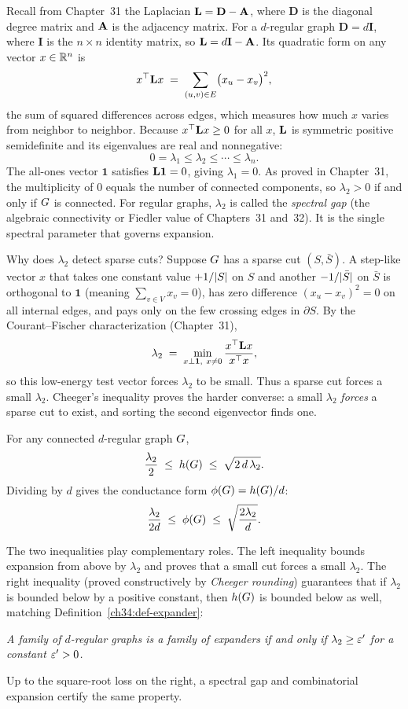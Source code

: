 Recall from Chapter~31 the Laplacian $\mathbf{L}=\mathbf{D}-\mathbf{A}$, where $\mathbf{D}$ is the diagonal degree matrix and $\mathbf{A}$ is the adjacency matrix. For a $d$-regular graph $\mathbf{D}=d\mathbf{I}$, where $\mathbf{I}$ is the $n\times n$ identity matrix, so $\mathbf{L}=d\mathbf{I}-\mathbf{A}$. Its quadratic form on any vector $x\in\mathbb{R}^n$ is
\[
  x^\top \mathbf{L} x \;=\; \sum_{(u,v)\in E}\bigl(x_u-x_v\bigr)^2,
\]
the sum of squared differences across edges, which measures how much $x$ varies from neighbor to neighbor. Because $x^\top\mathbf{L} x\ge 0$ for all $x$, $\mathbf{L}$ is symmetric positive semidefinite and its eigenvalues are real and nonnegative:
\[
  0=\lambda_1\le \lambda_2\le\cdots\le\lambda_n.
\]
The all-ones vector $\mathbf{1}$ satisfies $\mathbf{L}\mathbf{1}=0$, giving $\lambda_1=0$. As proved in Chapter~31, the multiplicity of $0$ equals the number of connected components, so $\lambda_2>0$ if and only if $G$ is connected. For regular graphs, $\lambda_2$ is called the \emph{spectral gap} (the algebraic connectivity or Fiedler value of Chapters~31 and~32). It is the single spectral parameter that governs expansion.

\begin{intuitionbox}
Why does $\lambda_2$ detect sparse cuts? Suppose $G$ has a sparse cut $(S,\bar S)$. A step-like vector $x$ that takes one constant value $+1/\lvert S\rvert$ on $S$ and another $-1/\lvert\bar S\rvert$ on $\bar S$ is orthogonal to $\mathbf{1}$ (meaning $\sum_{v\in V}x_v = 0$), has zero difference $(x_u-x_v)^2=0$ on all internal edges, and pays only on the few crossing edges in $\partial S$. By the Courant--Fischer characterization (Chapter~31),
\[
  \lambda_2\;=\;\min_{x\perp\mathbf{1},\ x\ne 0}\frac{x^\top\mathbf{L} x}{x^\top x},
\]
so this low-energy test vector forces $\lambda_2$ to be small. Thus a sparse cut forces a small $\lambda_2$. Cheeger's inequality proves the harder converse: a small $\lambda_2$ \emph{forces} a sparse cut to exist, and sorting the second eigenvector finds one.
\end{intuitionbox}

\begin{theorem}
\label{ch34:thm-cheeger}
For any connected $d$-regular graph $G$,
\[
  \frac{\lambda_2}{2}\;\le\; h(G)\;\le\;\sqrt{2\,d\,\lambda_2}.
\]
Dividing by $d$ gives the conductance form $\phi(G)=h(G)/d$:
\[
  \frac{\lambda_2}{2d}\;\le\; \phi(G)\;\le\;\sqrt{\frac{2\lambda_2}{d}}.
\]
\end{theorem}

The two inequalities play complementary roles. The left inequality bounds expansion from above by $\lambda_2$ and proves that a small cut forces a small $\lambda_2$. The right inequality (proved constructively by \emph{Cheeger rounding}) guarantees that if $\lambda_2$ is bounded below by a positive constant, then $h(G)$ is bounded below as well, matching Definition~\ref{ch34:def-expander}:
\begin{center}
\emph{A family of $d$-regular graphs is a family of expanders if and only if $\lambda_2\ge \varepsilon'$ for a constant $\varepsilon'>0$.}
\end{center}
Up to the square-root loss on the right, a spectral gap and combinatorial expansion certify the same property.

